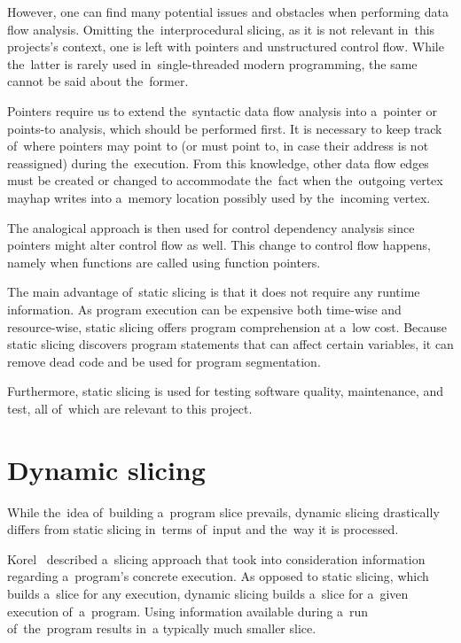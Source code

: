 However, one can find many potential issues and obstacles when performing 
data flow analysis. 
Omitting the~interprocedural slicing, as it is not relevant in~this projects's
context, one is left with pointers and unstructured control flow.
While the~latter is rarely used in~single-threaded modern programming, 
the same cannot be said about the~former. 

Pointers require us to extend the~syntactic data flow analysis 
into a~pointer or points-to analysis, which should be performed first. 
It is necessary to keep track of~where pointers may point to (or must point to,
in case their address is not reassigned) during the~execution. 
From this knowledge, other data flow edges must be created or
changed to accommodate the~fact when the~outgoing vertex mayhap writes
into a~memory location possibly used by the~incoming vertex. 

The analogical approach is then used for control dependency analysis since 
pointers might alter control flow as well. 
This change to control flow happens, namely when functions are called using 
function pointers.

The main advantage of~static slicing is that it does not require
any runtime information. 
As program execution can be expensive both time-wise and resource-wise, 
static slicing offers program comprehension at a~low cost. 
Because static slicing discovers program statements that can affect 
certain variables, it can remove dead code and be used for program segmentation. 

Furthermore, static slicing is used for testing software quality, maintenance, 
and test, all of~which are relevant to this project.

\section{Dynamic slicing}\label{chap:dynamicslicing}

While the~idea of~building a~program slice prevails, dynamic slicing 
drastically differs from static slicing in~terms of~input and the~way
it is processed. 

Korel~\citep{Korel88} described a~slicing approach that took into 
consideration information regarding a~program's concrete execution. 
As opposed to static slicing, which builds a~slice for any execution, 
dynamic slicing builds a~slice for a~given execution of~a~program. 
Using information available during a~run of~the~program 
results in~a typically much smaller slice.

